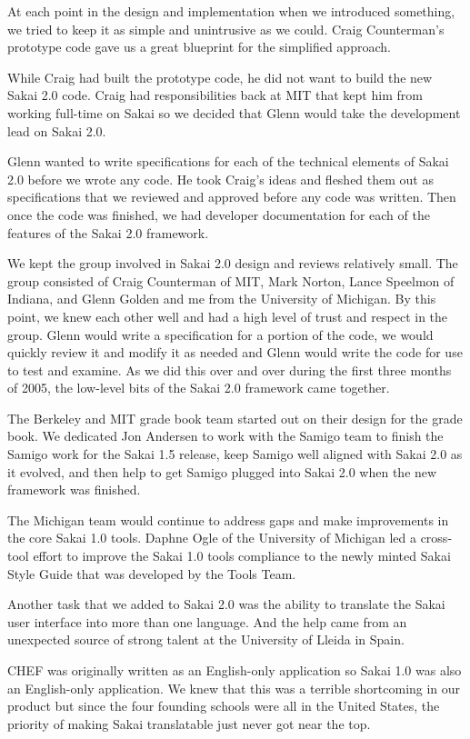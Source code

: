 \documentclass[12pt]{book}
\begin{document}
At each point in the design and implementation when we
introduced something, we tried to keep it as simple and
unintrusive as we could.  Craig Counterman's prototype
code gave us a great blueprint for the simplified approach.

While Craig had built the prototype code, he did not want
to build the new Sakai 2.0 code.  Craig had responsibilities
back at MIT that kept him from working full-time on Sakai
so we decided that Glenn would take the development
lead on Sakai 2.0.

Glenn wanted to write specifications for each of
the technical elements of Sakai 2.0 before we wrote
any code.  He took Craig's ideas and fleshed them out
as specifications that we reviewed and approved
before any code was written.
Then once the code was finished, we had developer
documentation for each of the features of the Sakai 2.0
framework.

We kept the group involved in Sakai 2.0 design and reviews
relatively small.  The group consisted of Craig Counterman
of MIT, Mark Norton, Lance Speelmon of Indiana, and
Glenn Golden and me from the University of Michigan.  By this
point, we knew each other well and had a high level of trust
and respect in the group.  Glenn would write a specification for
a portion of the code, we would quickly review it and modify
it as needed and Glenn would write the code for use to
test and examine.  As we did this over and over during the
first three months of 2005, the low-level
bits of the Sakai 2.0 framework came together.

The Berkeley and MIT grade book team started out on their
design for the grade book.  We dedicated Jon
Andersen to work with the Samigo team to finish the
Samigo work for the Sakai 1.5 release, keep
Samigo well aligned with Sakai 2.0 as it evolved,
and then help to get Samigo plugged into Sakai 2.0
when the new framework was finished.

The Michigan team would continue to address gaps and make
improvements in the core Sakai 1.0 tools.  Daphne Ogle
of the University of Michigan led a cross-tool effort to
improve the Sakai 1.0 tools compliance to the newly minted
Sakai Style Guide that was developed by the Tools Team.

Another task that we added to Sakai 2.0 was the ability
to translate the Sakai user interface into more than one
language.  And the help came from an unexpected source
of strong talent at the University of Lleida in Spain.

CHEF was originally written as an English-only application
so Sakai 1.0 was also an English-only application.
We knew that this was a terrible shortcoming in our product
but since the four founding schools were all in the
United States, the priority of making Sakai translatable
just never got near the top.
\end{document}
